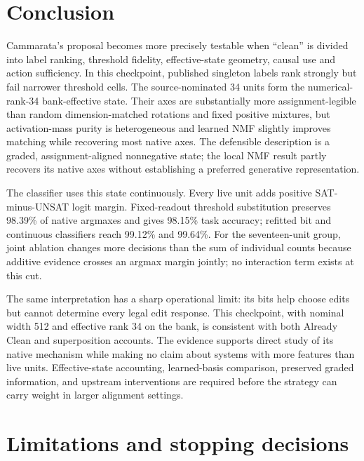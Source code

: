 \documentclass[
  british,
  11pt,
  a4paper,
]{article}
\begin{document}
\section{Conclusion}\label{conclusion}

Cammarata's proposal becomes more precisely testable when ``clean'' is
divided into label ranking, threshold fidelity, effective-state
geometry, causal use and action sufficiency. In this checkpoint,
published singleton labels rank strongly but fail narrower threshold
cells. The source-nominated 34 units form the numerical-rank-34
bank-effective state. Their axes are substantially more
assignment-legible than random dimension-matched rotations and fixed
positive mixtures, but activation-mass purity is heterogeneous and
learned NMF slightly improves matching while recovering most native
axes. The defensible description is a graded, assignment-aligned
nonnegative state; the local NMF result partly recovers its native axes
without establishing a preferred generative representation.

The classifier uses this state continuously. Every live unit adds
positive SAT-minus-UNSAT logit margin. Fixed-readout threshold
substitution preserves 98.39\% of native argmaxes and gives 98.15\% task
accuracy; refitted bit and continuous classifiers reach 99.12\% and
99.64\%. For the seventeen-unit group, joint ablation changes more
decisions than the sum of individual counts because additive evidence
crosses an argmax margin jointly; no interaction term exists at this
cut.

The same interpretation has a sharp operational limit: its bits help
choose edits but cannot determine every legal edit response. This
checkpoint, with nominal width 512 and effective rank 34 on the bank, is
consistent with both Already Clean and superposition accounts. The
evidence supports direct study of its native mechanism while making no
claim about systems with more features than live units. Effective-state
accounting, learned-basis comparison, preserved graded information, and
upstream interventions are required before the strategy can carry weight
in larger alignment settings.

\section{Limitations and stopping
decisions}\label{limitations-and-stopping-decisions}
\end{document}
